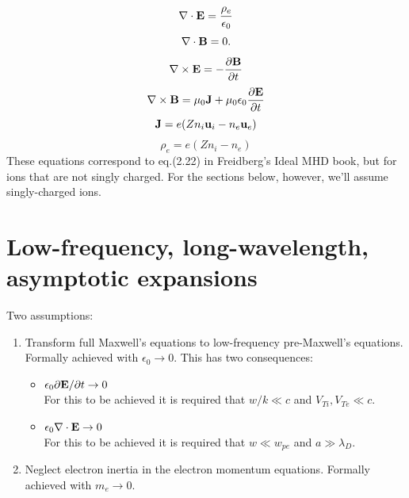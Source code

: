 \documentclass[a4paper,11pt]{report}
\begin{document}
\begin{equation}
\label{eq:twof_maxwell_3}
\nabla \cdot \mathbf{E} = \frac{\rho_e}{\epsilon_0} 
\end{equation}
\begin{equation}
\label{eq:twof_maxwell_4}
\nabla \cdot \mathbf{B} = 0.
\end{equation}
\begin{equation}
\label{eq:twof_maxwell_1}
\nabla \times \mathbf{E} = -\frac{ \partial \mathbf{B}}{\partial t}
\end{equation}
\begin{equation}
\label{eq:twof_maxwell_2}
\nabla \times \mathbf{B} = \mu_0 \mathbf{J} + \mu_0 \epsilon_0 \frac{\partial \mathbf{E}}{\partial t}
\end{equation}
\begin{equation}
\label{eq:twof_curr_density}
    \mathbf{J} = e (Z n_i \mathbf{u}_i - n_e \mathbf{u}_e)
\end{equation}
\begin{equation}
\label{eq:twof_mass_density}
    \rho_e = e (Z n_i - n_e) 
\end{equation}
These equations correspond to eq.\@ (2.22) in Freidberg's Ideal MHD book, but for ions that are not singly charged. For the sections below, however, we'll assume singly-charged ions.

\section{Low-frequency, long-wavelength, asymptotic expansions}
Two assumptions:
\begin{enumerate}
\item Transform full Maxwell's equations to low-frequency pre-Maxwell's equations. Formally achieved with $\epsilon_0 \to 0$. This has two consequences:
\begin{itemize}
\item $\epsilon_0 \partial \mathbf{E} / \partial t \to 0$ \\
For this to be achieved it is required that $w/k \ll c$ and $V_{Ti}, V_{Te} \ll c$.
\item $\epsilon_0 \nabla \cdot \mathbf{E} \to 0$\\
For this to be achieved it is required that $w \ll w_{pe}$ and $a \gg \lambda_{D}$.
\end{itemize}
\item Neglect electron inertia in the electron momentum equations. Formally achieved with $m_e \to 0$.
\end{enumerate}
\end{document}
